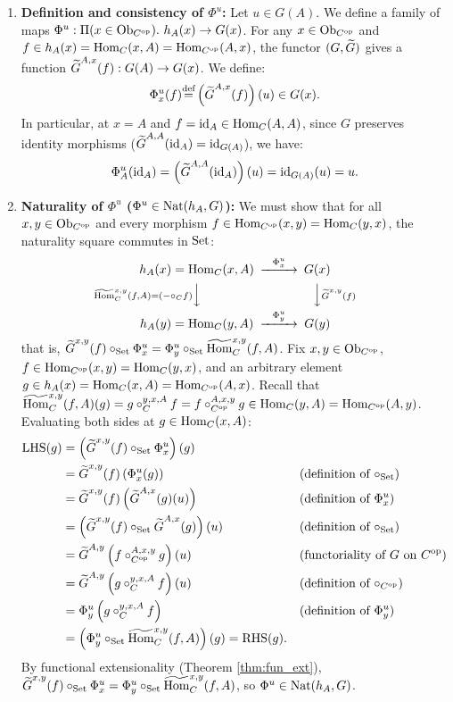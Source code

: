 \documentclass[10pt,a4paper]{article}
\begin{document}
\myprf
\begin{enumerate}
\item \textbf{Definition and consistency of $\Phi^u$:}
Let $u \in G(A)$. We define a family of maps $\Phi^u : \Pi(x \in {\textrm{Ob}}_{C^{\textrm{op}}}).\ h_A(x) \to G(x)$.
For any $x \in {\textrm{Ob}}_{C^{\textrm{op}}}$ and $f \in h_A(x) = {\textrm{Hom}}_C(x,A) = {\textrm{Hom}}_{C^{\textrm{op}}}(A,x)$, the functor $(G, {\widetilde{G}\textrm{}})$ gives a function ${\widetilde{G}\textrm{}}^{A,x}(f) : G(A) \to G(x)$. We define:
$$\Phi^u_x(f) {\stackrel{{\textrm{def}}}{=}} \left({\widetilde{G}\textrm{}}^{A,x}(f)\right)(u) \in G(x).$$
In particular, at $x = A$ and $f = {\textrm{id}}_A \in {\textrm{Hom}}_C(A,A)$, since $G$ preserves identity morphisms (${\widetilde{G}\textrm{}}^{A,A}({\textrm{id}}_A) = {\textrm{id}}_{G(A)}$), we have:
$$\Phi^u_A({\textrm{id}}_A) = \left({\widetilde{G}\textrm{}}^{A,A}({\textrm{id}}_A)\right)(u) = {\textrm{id}}_{G(A)}(u) = u.$$

\item \textbf{Naturality of $\Phi^u$ ($\Phi^u \in {\textrm{Nat}}(h_A, G)$):}
We must show that for all $x, y \in {\textrm{Ob}}_{C^{\textrm{op}}}$ and every morphism $f \in {\textrm{Hom}}_{C^{\textrm{op}}}(x,y) = {\textrm{Hom}}_C(y,x)$, the naturality square commutes in ${\textrm{Set}}$:
$$\begin{CD}
h_A(x) = \Hom_C(x,A) @>{\Phi^u_x}>> G(x) \\
@V{\HomMor_C^{x,y}(f,A) = (- \circ_C f)}VV @VV{\GMor^{x,y}(f)}V \\
h_A(y) = \Hom_C(y,A) @>{\Phi^u_y}>> G(y)
\end{CD}$$
that is, ${\widetilde{G}\textrm{}}^{x,y}(f) \circ_{\textrm{Set}} \Phi^u_x = \Phi^u_y \circ_{\textrm{Set}} {\widetilde{{\textrm{Hom}}}\textrm{}}_C^{x,y}(f,A)$.
Fix $x, y \in {\textrm{Ob}}_{C^{\textrm{op}}}$, $f \in {\textrm{Hom}}_{C^{\textrm{op}}}(x,y) = {\textrm{Hom}}_C(y,x)$, and an arbitrary element $g \in h_A(x) = {\textrm{Hom}}_C(x,A) = {\textrm{Hom}}_{C^{\textrm{op}}}(A,x)$.
Recall that ${\widetilde{{\textrm{Hom}}}\textrm{}}_C^{x,y}(f,A)(g) = g \circ_C^{y,x,A} f = f \circ_{C^{\textrm{op}}}^{A,x,y} g \in {\textrm{Hom}}_C(y,A) = {\textrm{Hom}}_{C^{\textrm{op}}}(A,y)$.
Evaluating both sides at $g \in {\textrm{Hom}}_C(x,A)$:
\begin{align*}
\textrm{LHS}(g) &= \left({\widetilde{G}\textrm{}}^{x,y}(f) \circ_{\textrm{Set}} \Phi^u_x\right)(g) \\
&= {\widetilde{G}\textrm{}}^{x,y}(f)\left(\Phi^u_x(g)\right) && \text{(definition of $\circ_{\textrm{Set}}$)} \\
&= {\widetilde{G}\textrm{}}^{x,y}(f)\left({\widetilde{G}\textrm{}}^{A,x}(g)(u)\right) && \text{(definition of $\Phi^u_x$)} \\
&= \left({\widetilde{G}\textrm{}}^{x,y}(f) \circ_{\textrm{Set}} {\widetilde{G}\textrm{}}^{A,x}(g)\right)(u) && \text{(definition of $\circ_{\textrm{Set}}$)} \\
&= {\widetilde{G}\textrm{}}^{A,y}\left(f \circ_{C^{\textrm{op}}}^{A,x,y} g\right)(u) && \text{(functoriality of $G$ on $C^{\textrm{op}}$)} \\
&= {\widetilde{G}\textrm{}}^{A,y}\left(g \circ_C^{y,x,A} f\right)(u) && \text{(definition of $\circ_{C^{\textrm{op}}}$)} \\
&= \Phi^u_y\left(g \circ_C^{y,x,A} f\right) && \text{(definition of $\Phi^u_y$)} \\
&= \left(\Phi^u_y \circ_{\textrm{Set}} {\widetilde{{\textrm{Hom}}}\textrm{}}_C^{x,y}(f,A)\right)(g) = \textrm{RHS}(g).
\end{align*}
By functional extensionality (Theorem \ref{thm:fun_ext}), ${\widetilde{G}\textrm{}}^{x,y}(f) \circ_{\textrm{Set}} \Phi^u_x = \Phi^u_y \circ_{\textrm{Set}} {\widetilde{{\textrm{Hom}}}\textrm{}}_C^{x,y}(f,A)$, so $\Phi^u \in {\textrm{Nat}}(h_A, G)$.


\end{enumerate}
\end{document}
